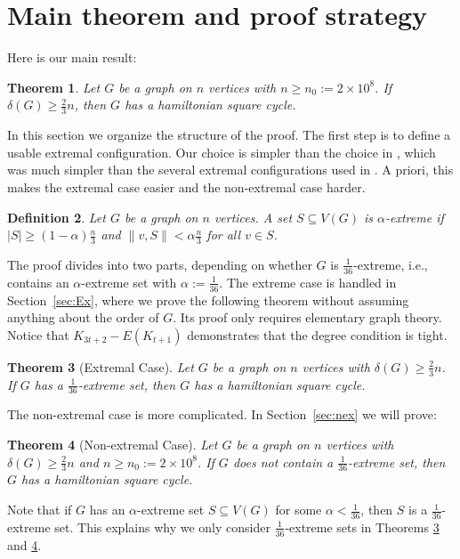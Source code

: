 \documentclass[oneside,12pt]{memoir}
\newtheorem{theorem}{Theorem}[section]
\newtheorem{definition}[theorem]{Definition}
\newcommand{\n}{2\times 10^8}
\begin{document}
\section{Main theorem and proof strategy}

Here is our main result:
\begin{theorem}
\label{posamain} Let $G$ be a graph on $n$ vertices with $n\geq n_{0}:=\n$.
If $\delta(G)\geq\frac{2}{3}n$, then $G$ has a hamiltonian square cycle.
\end{theorem}
In this section we organize the structure of the proof. The first
step is to define a usable extremal configuration. Our choice is simpler
than the choice in \cite{LSS}, which was much simpler than the several
extremal configurations used in \cite{KSSp}. A priori, this makes the extremal case easier and the non-extremal case harder.
\begin{definition}
Let $G$ be a graph on $n$ vertices.  A set $S\subseteq V(G)$ is $\alpha$-\emph{extreme} if $|S|\geq (1-\alpha)\frac{n}{3}$
and $\|v,S\|<\alpha \frac{n}{3}$ for all $v\in S$. 
\end{definition}
The proof divides into two parts, depending on whether $G$ is $\frac{1}{36}$-extreme,
i.e., contains an $\alpha$-extreme set with $\alpha:=\frac{1}{36}$.
The extreme case is handled in Section~\ref{sec:Ex}, where we prove
the following theorem without assuming anything about the order of
$G$. Its proof only requires elementary graph theory. Notice that
$K_{3t+2}-E(K_{t+1})$ demonstrates that the degree condition is tight.
\begin{theorem}[Extremal Case]
\label{thm:good}Let $G$ be a graph on $n$ vertices with $\delta(G)\geq \frac{2}{3}n$. If $G$ has a $\frac{1}{36}$-extreme set, then $G$ has a hamiltonian square cycle. 
\end{theorem}
The non-extremal case is more complicated. In Section~\ref{sec:nex} we will prove: 
\begin{theorem}[Non-extremal Case]
\label{non-extremal} Let $G$ be a graph on $n$ vertices with $\delta(G)\geq\frac{2}{3}n$
and $n\geq n_{0}:=\n$. If $G$ does not contain a $\frac{1}{36}$-extreme
set, then $G$ has a hamiltonian square cycle. 
\end{theorem}

Note that if $G$ has an $\alpha$-extreme set $S\subseteq V(G)$ for some $\alpha<\frac{1}{36}$, then $S$ is a $\frac{1}{36}$-extreme set.  This explains why we only consider $\frac{1}{36}$-extreme sets in Theorems \ref{thm:good} and \ref{non-extremal}.
\end{document}
